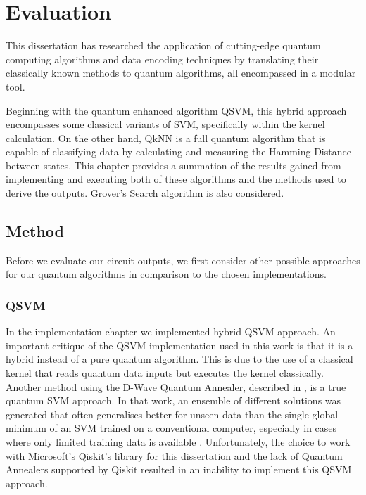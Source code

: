 \chapter{Evaluation}
This dissertation has researched the application of cutting-edge quantum computing algorithms and data encoding techniques by translating their classically known methods to quantum algorithms, all encompassed in a modular tool. %

Beginning with the quantum enhanced algorithm QSVM, this hybrid approach encompasses some classical variants of SVM, specifically within the kernel calculation. On the other hand, QkNN is a full quantum algorithm that is capable of classifying data by calculating and measuring the Hamming Distance between states.
This chapter provides a summation of the results gained from implementing and executing both of these algorithms and the methods used to derive the outputs. Grover's Search algorithm is also considered.


\section{Method}


Before we evaluate our circuit outputs, we first consider other possible approaches for our quantum algorithms in comparison to the chosen implementations.



\subsection{QSVM}
In the implementation chapter we implemented \citep{mcrae2020} hybrid QSVM approach.
An important critique of the QSVM implementation used in this work is that it is a hybrid instead of a pure quantum algorithm. This is due to the use of a classical kernel that reads quantum data inputs but executes the kernel classically.
Another method using the D-Wave Quantum Annealer, described in \citep{WILLShh}, is a true quantum SVM approach. In that work, an ensemble of different solutions was generated that often generalises better for unseen data than the single global minimum of an SVM trained on a conventional computer, especially in cases where only limited training data is available \citep{WILLShh}.
Unfortunately, the choice to work with Microsoft's Qiskit's library for this dissertation and the lack of Quantum Annealers supported by Qiskit resulted in an inability to implement this QSVM approach.

